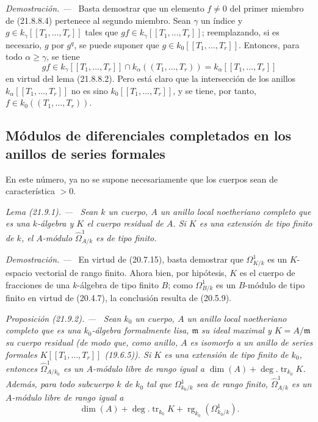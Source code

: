 \documentclass[10pt,oneside]{book}
\makeatletter
\newcommand{\setmanualcurrentlabel}[1]{\def\@currentlabel{#1}}
\newcommand{\oldpage}[2][]{%
  \setcounter{footnote}{0}%
  \marginpar{\scriptsize\textbf{#1}~|~#2}\ignorespaces}
\newenvironment{proposition}[1][]{%
  \setmanualcurrentlabel{#1}\par\medskip\noindent\itshape Proposición (#1). ---\ }{\par}
\newenvironment{lemma}[1][]{%
  \setmanualcurrentlabel{#1}\par\medskip\noindent\itshape Lema (#1). ---\ }{\par}
\newenvironment{proof}{%
  \par\medskip\noindent\textit{Demostración. ---\ }}{\par}
\makeatother
\begin{document}
\begin{proof}
\oldpage[0\textsubscript{IV-1}]{176}
Basta demostrar que un elemento $f\ne0$ del primer miembro de (21.8.8.4)
pertenece al segundo miembro. Sean $\gamma$ un índice y
$g\in k_\gamma[[T_1,\ldots,T_r]]$ tales que
$gf\in k_\gamma[[T_1,\ldots,T_r]]$; reemplazando, si es necesario, $g$ por
$g^q$, se puede suponer que $g\in k_0[[T_1,\ldots,T_r]]$. Entonces, para todo
$\alpha\geqslant\gamma$, se tiene
\[
  gf\in k_\gamma[[T_1,\ldots,T_r]]\cap k_\alpha((T_1,\ldots,T_r))
  =k_\alpha[[T_1,\ldots,T_r]]
\]
en virtud del lema (21.8.8.2). Pero está claro que la intersección de los
anillos $k_\alpha[[T_1,\ldots,T_r]]$ no es sino
$k_0[[T_1,\ldots,T_r]]$, y se tiene, por tanto,
$f\in k_0((T_1,\ldots,T_r))$.
\end{proof}

\subsection{Módulos de diferenciales completados en los anillos de series formales}
\label{subsection:0.21.9-es}

En este número, ya no se supone necesariamente que los cuerpos sean de
característica $>0$.

\begin{lemma}[21.9.1]
\label{0.21.9.1-es}
Sean $k$ un cuerpo, $A$ un anillo local noetheriano completo que es una
$k$-álgebra y $K$ el cuerpo residual de $A$. Si $K$ es una extensión de tipo
finito de $k$, el $A$-módulo $\widehat\Omega^1_{A/k}$ es de tipo finito.
\end{lemma}

\begin{proof}
En virtud de (20.7.15), basta demostrar que $\Omega^1_{K/k}$ es un
$K$-espacio vectorial de rango finito. Ahora bien, por hipótesis, $K$ es el
cuerpo de fracciones de una $k$-álgebra de tipo finito $B$; como
$\Omega^1_{B/k}$ es un $B$-módulo de tipo finito en virtud de (20.4.7), la
conclusión resulta de (20.5.9).
\end{proof}

\begin{proposition}[21.9.2]
\label{0.21.9.2-es}
Sean $k_0$ un cuerpo, $A$ un anillo local noetheriano completo que es una
$k_0$-álgebra formalmente lisa, $\mathfrak m$ su ideal maximal y
$K=A/\mathfrak m$ su cuerpo residual (de modo que, como anillo, $A$ es
isomorfo a un anillo de series formales $K[[T_1,\ldots,T_r]]$ (19.6.5)).
Si $K$ es una extensión de tipo finito de $k_0$, entonces
$\widehat\Omega^1_{A/k_0}$ es un $A$-módulo libre de rango igual a
$\dim(A)+\deg.\operatorname{tr}_{k_0}K$. Además, para todo subcuerpo $k$ de
$k_0$ tal que $\Omega^1_{k_0/k}$ sea de rango finito,
$\widehat\Omega^1_{A/k}$ es un $A$-módulo libre de rango igual a
\[
  \dim(A)+\deg.\operatorname{tr}_{k_0}K
  +\operatorname{rg}_{k_0}(\Omega^1_{k_0/k}).
\]
\end{proposition}
\end{document}
